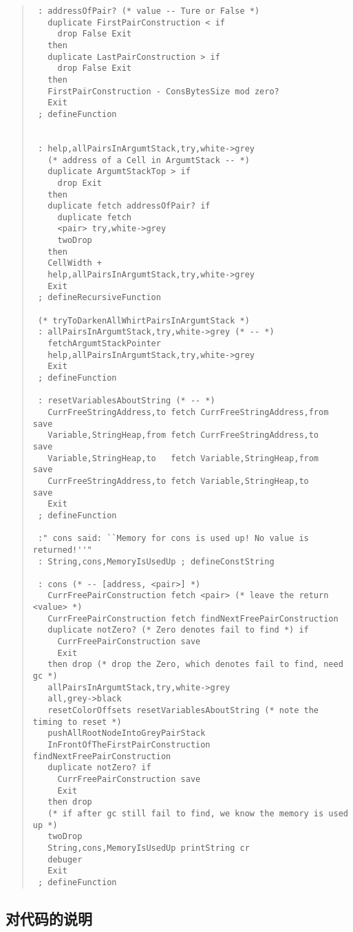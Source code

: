 \documentclass[a4paper]{article}
\begin{document}
\begin{quote}
\begin{verbatim}
 : addressOfPair? (* value -- Ture or False *)
   duplicate FirstPairConstruction < if
     drop False Exit
   then
   duplicate LastPairConstruction > if
     drop False Exit
   then
   FirstPairConstruction - ConsBytesSize mod zero?
   Exit
 ; defineFunction


 : help,allPairsInArgumtStack,try,white->grey
   (* address of a Cell in ArgumtStack -- *)
   duplicate ArgumtStackTop > if
     drop Exit
   then
   duplicate fetch addressOfPair? if
     duplicate fetch
     <pair> try,white->grey
     twoDrop
   then
   CellWidth +
   help,allPairsInArgumtStack,try,white->grey
   Exit
 ; defineRecursiveFunction

 (* tryToDarkenAllWhirtPairsInArgumtStack *)
 : allPairsInArgumtStack,try,white->grey (* -- *)
   fetchArgumtStackPointer
   help,allPairsInArgumtStack,try,white->grey
   Exit
 ; defineFunction

 : resetVariablesAboutString (* -- *)
   CurrFreeStringAddress,to fetch CurrFreeStringAddress,from save
   Variable,StringHeap,from fetch CurrFreeStringAddress,to   save
   Variable,StringHeap,to   fetch Variable,StringHeap,from   save
   CurrFreeStringAddress,to fetch Variable,StringHeap,to     save
   Exit
 ; defineFunction

 :" cons said: ``Memory for cons is used up! No value is returned!''"
 : String,cons,MemoryIsUsedUp ; defineConstString

 : cons (* -- [address, <pair>] *)
   CurrFreePairConstruction fetch <pair> (* leave the return <value> *)
   CurrFreePairConstruction fetch findNextFreePairConstruction
   duplicate notZero? (* Zero denotes fail to find *) if
     CurrFreePairConstruction save
     Exit
   then drop (* drop the Zero, which denotes fail to find, need gc *)
   allPairsInArgumtStack,try,white->grey
   all,grey->black
   resetColorOffsets resetVariablesAboutString (* note the timing to reset *)
   pushAllRootNodeIntoGreyPairStack
   InFrontOfTheFirstPairConstruction findNextFreePairConstruction
   duplicate notZero? if
     CurrFreePairConstruction save
     Exit
   then drop
   (* if after gc still fail to find, we know the memory is used up *)
   twoDrop
   String,cons,MemoryIsUsedUp printString cr
   debuger
   Exit
 ; defineFunction
\end{verbatim}
\end{quote}




\subsection{对代码的说明}
\end{document}
